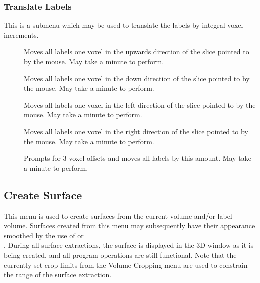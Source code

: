 \subsubsection{Translate Labels}

This is a submenu which may be used to translate the labels by integral voxel
increments.

\begin{description}
\item[]  Moves all labels one voxel in the
    upwards direction of the slice pointed to by the mouse.  May take
    a minute to perform.
\item[]  Moves all labels one voxel in the
    down direction of the slice pointed to by the mouse.  May take
    a minute to perform.
\item[]  Moves all labels one voxel in the
    left direction of the slice pointed to by the mouse.  May take
    a minute to perform.
\item[]  Moves all labels one voxel in the
    right direction of the slice pointed to by the mouse.  May take
    a minute to perform.
\item[]  Prompts for 3 voxel
    offsets and moves all labels by this amount.
    May take a minute to perform.
\end{description}


\subsection{Create Surface}

This menu is used to create surfaces from the current volume and/or label
volume.  Surfaces created
from this menu may subsequently have their appearance smoothed by
the use of  or \\
.  During all surface extractions,
the surface is displayed in the 3D window as it is being created, and
all program operations are still functional.  Note that the currently set
crop limits from the Volume Cropping menu are used to constrain the range
of the surface extraction.

